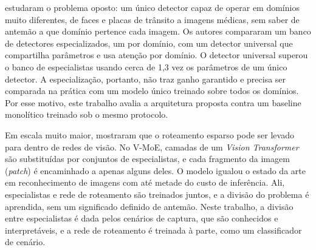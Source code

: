  estudaram o problema oposto: um único detector capaz de operar em domínios muito diferentes, de faces e placas de trânsito a imagens médicas, sem saber de antemão a que domínio pertence cada imagem. Os autores compararam um banco de detectores especializados, um por domínio, com um detector universal que compartilha parâmetros e usa atenção por domínio. O detector universal superou o banco de especialistas usando cerca de 1,3 vez os parâmetros de um único detector. A especialização, portanto, não traz ganho garantido e precisa ser comparada na prática com um modelo único treinado sobre todos os domínios. Por esse motivo, este trabalho avalia a arquitetura proposta contra um baseline monolítico treinado sob o mesmo protocolo.

Em escala muito maior,  mostraram que o roteamento esparso pode ser levado para dentro de redes de visão. No V-MoE, camadas de um \textit{Vision Transformer} são substituídas por conjuntos de especialistas, e cada fragmento da imagem (\textit{patch}) é encaminhado a apenas alguns deles. O modelo igualou o estado da arte em reconhecimento de imagens com até metade do custo de inferência. Ali, especialistas e rede de roteamento são treinados juntos, e a divisão do problema é aprendida, sem um significado definido de antemão. Neste trabalho, a divisão entre especialistas é dada pelos cenários de captura, que são conhecidos e interpretáveis, e a rede de roteamento é treinada à parte, como um classificador de cenário.
